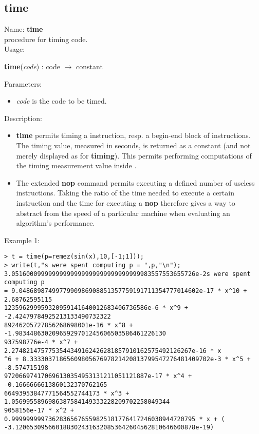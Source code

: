 \subsection{time}
\label{labtime}
\noindent Name: \textbf{time}\\
\phantom{aaa}procedure for timing \sollya code.\\[0.2cm]
\noindent Usage: 
\begin{center}
\textbf{time}(\emph{code}) : \textsf{code} $\rightarrow$ \textsf{constant}\\
\end{center}
Parameters: 
\begin{itemize}
\item \emph{code} is the code to be timed.
\end{itemize}
\noindent Description: \begin{itemize}

\item \textbf{time} permits timing a \sollya instruction, resp. a begin-end block
   of \sollya instructions. The timing value, measured in seconds, is returned
   as a \sollya constant (and not merely displayed as for \textbf{timing}). This 
   permits performing computations of the timing measurement value inside \sollya.

\item The extended \textbf{nop} command permits executing a defined number of
   useless instructions. Taking the ratio of the time needed to execute a
   certain \sollya instruction and the time for executing a \textbf{nop}
   therefore gives a way to abstract from the speed of a particular 
   machine when evaluating an algorithm's performance.
\end{itemize}
\noindent Example 1: 
\begin{center}\begin{minipage}{15cm}\begin{Verbatim}[frame=single]
> t = time(p=remez(sin(x),10,[-1;1]));
> write(t,"s were spent computing p = ",p,"\n");
3.05160009999999999999999999999999999983557553655726e-2s were spent computing p 
= 9.0486898749977990986908851357759191711354777014602e-17 * x^10 + 2.68762595115
123596299959320959141640012683406736586e-6 * x^9 + -2.42479784925213133490732322
89246205727856268698001e-16 * x^8 + -1.98344863020965929701245606503586461226130
937598776e-4 * x^7 + 2.2748214757753544349162426281857910162575492126267e-16 * x
^6 + 8.3333037186560980567697821420813799547276481409702e-3 * x^5 + -8.574715198
972066974170696130354953131211051121887e-17 * x^4 + -0.1666666613860132370762165
66493953847771564552744173 * x^3 + 1.0569955896986387584149333228209702258049344
9058156e-17 * x^2 + 0.99999999973628365676559825181776417246038944720795 * x + (
-3.1206530956601883024316320853642604562810646600878e-19)
\end{Verbatim}
\end{minipage}\end{center}
